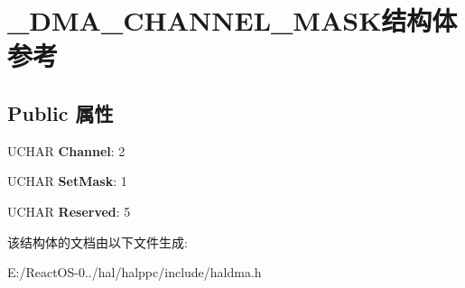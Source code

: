 \hypertarget{struct___d_m_a___c_h_a_n_n_e_l___m_a_s_k}{}\section{\+\_\+\+D\+M\+A\+\_\+\+C\+H\+A\+N\+N\+E\+L\+\_\+\+M\+A\+S\+K结构体 参考}
\label{struct___d_m_a___c_h_a_n_n_e_l___m_a_s_k}
\subsection*{Public 属性}
\begin{DoxyCompactItemize}
\item 
\mbox{\label{struct___d_m_a___c_h_a_n_n_e_l___m_a_s_k_a9d2d80cd4cefaaef137d2a82977e6a9c}} 
U\+C\+H\+AR {\bfseries Channel}\+: 2
\item 
\mbox{\label{struct___d_m_a___c_h_a_n_n_e_l___m_a_s_k_a7292209f403aab74588c14c0a9ed836a}} 
U\+C\+H\+AR {\bfseries Set\+Mask}\+: 1
\item 
\mbox{\label{struct___d_m_a___c_h_a_n_n_e_l___m_a_s_k_a8318272ab1154726f92e6a5aa493694a}} 
U\+C\+H\+AR {\bfseries Reserved}\+: 5
\end{DoxyCompactItemize}


该结构体的文档由以下文件生成\+:\begin{DoxyCompactItemize}
\item 
E\+:/\+React\+O\+S-\/0../hal/halppc/include/haldma.\+h\end{DoxyCompactItemize}
